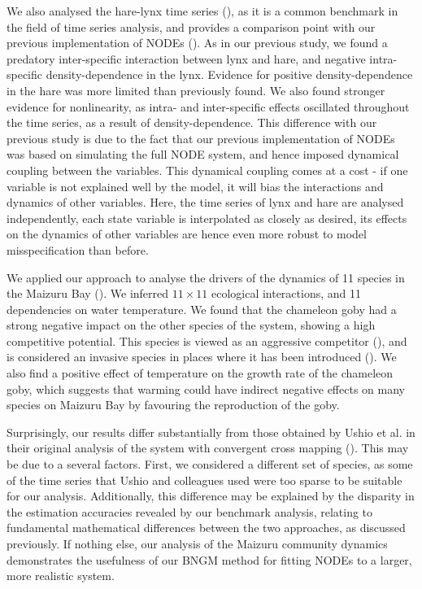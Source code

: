 \documentclass[11pt, oneside]{article}
\begin{document}
We also analysed the hare-lynx time series (\cite{Odum1972}), as it is a common benchmark in the field of time series analysis, and provides a comparison point with our previous implementation of NODEs (\cite{Bonnaffe2021a}).
As in our previous study, we found a predatory inter-specific interaction between lynx and hare, and negative intra-specific density-dependence in the lynx.
Evidence for positive density-dependence in the hare was more limited than previously found.
We also found stronger evidence for nonlinearity, as intra- and inter-specific effects oscillated throughout the time series, as a result of density-dependence.
This difference with our previous study is due to the fact that our previous implementation of NODEs was based on simulating the full NODE system, and hence imposed dynamical coupling between the variables.
This dynamical coupling comes at a cost - if one variable is not explained well by the model, it will bias the interactions and dynamics of other variables.
Here, the time series of lynx and hare are analysed independently, each state variable is interpolated as closely as desired, its effects on the dynamics of other variables are hence even more robust to model misspecification than before.

We applied our approach to analyse the drivers of the dynamics of 11 species in the Maizuru Bay (\cite{Ushio2018}).
We inferred $11 \times 11$ ecological interactions, and 11 dependencies on water temperature.
We found that the chameleon goby had a strong negative impact on the other species of the system, showing a high competitive potential.
This species is viewed as an aggressive competitor (\cite{Ushio2018}), and is considered an invasive species in places where it has been introduced (\cite{Goren2009}).
We also find a positive effect of temperature on the growth rate of the chameleon goby, which suggests that warming could have indirect negative effects on many species on Maizuru Bay by favouring the reproduction of the goby.

Surprisingly, our results differ substantially from those obtained by Ushio et al. in their original analysis of the system with convergent cross mapping (\cite{Ushio2018}).
This may be due to a several factors.
First, we considered a different set of species, as some of the time series that Ushio and colleagues used were too sparse to be suitable for our analysis.
Additionally, this difference may be explained by the disparity in the estimation accuracies revealed by our benchmark analysis, relating to fundamental mathematical differences between the two approaches, as discussed previously.
If nothing else, our analysis of the Maizuru community dynamics demonstrates the usefulness of our BNGM method for fitting NODEs to a larger, more realistic system.
\end{document}
